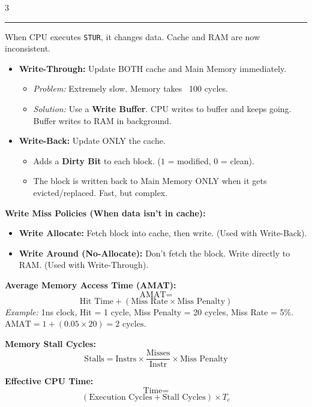 \documentclass[8pt, letterpaper]{extarticle}
\newcommand{\sectionhead}[1]{%
    \vspace{1.5mm}{\small\bfseries\uppercase{#1}}\vspace{0.2mm}\hrule\vspace{0.5mm}%
}
\begin{document}
\begin{multicols}{3}
\sectionhead{Handling Cache Writes}
When CPU executes \texttt{STUR}, it changes data. Cache and RAM are now inconsistent.
\begin{itemize}
    \item \textbf{Write-Through:} Update BOTH cache and Main Memory immediately.
    \begin{itemize}
        \item \textit{Problem:} Extremely slow. Memory takes ~100 cycles.
        \item \textit{Solution:} Use a \textbf{Write Buffer}. CPU writes to buffer and keeps going. Buffer writes to RAM in background.
    \end{itemize}
    \item \textbf{Write-Back:} Update ONLY the cache.
    \begin{itemize}
        \item Adds a \textbf{Dirty Bit} to each block. ($1$ = modified, $0$ = clean).
        \item The block is written back to Main Memory ONLY when it gets evicted/replaced. Fast, but complex.
    \end{itemize}
\end{itemize}

\textbf{Write Miss Policies (When data isn't in cache):}
\begin{itemize}
    \item \textbf{Write Allocate:} Fetch block into cache, then write. (Used with Write-Back).
    \item \textbf{Write Around (No-Allocate):} Don't fetch the block. Write directly to RAM. (Used with Write-Through).
\end{itemize}

\begin{tcolorbox}[colback=red!5, colframe=red!75!black, boxrule=0.5pt, title=\textbf{Cache Performance Equations}]
\textbf{Average Memory Access Time (AMAT):}
\[ \text{AMAT} = \]
\[\text{Hit Time} + (\text{Miss Rate} \times \text{Miss Penalty}) \]
\textit{Example:} 1ns clock, Hit = 1 cycle, Miss Penalty = 20 cycles, Miss Rate = 5\%. $\text{AMAT} = 1 + (0.05 \times 20) = 2\text{ cycles}$.

\textbf{Memory Stall Cycles:}
\[ \text{Stalls} = \text{Instrs} \times \frac{\text{Misses}}{\text{Instr}} \times \text{Miss Penalty} \]

\textbf{Effective CPU Time:}
\[ \text{Time} = \]
\[(\text{Execution Cycles} + \text{Stall Cycles}) \times T_c \]
\end{tcolorbox}


\end{multicols}
\end{document}
